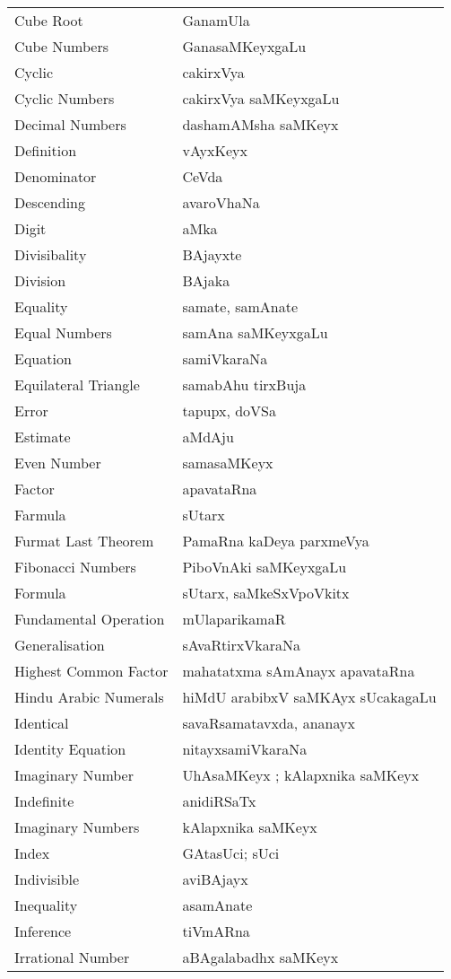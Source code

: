 \begin{longtable}{>{\rm}l@{\hspace{2cm}}l}
Cube Root & GanamUla\\
Cube Numbers & GanasaMKeyxgaLu\\
Cyclic & cakirxVya\\
Cyclic Numbers & cakirxVya saMKeyxgaLu\\
Decimal Numbers & dashamAMsha saMKeyx\\
Definition & vAyxKeyx\\
Denominator & CeVda\\
Descending & avaroVhaNa\\
Digit & aMka\\
Divisibality & BAjayxte\\
Division & BAjaka\\
Equality & samate, samAnate\\
Equal Numbers & samAna saMKeyxgaLu\\
Equation & samiVkaraNa\\
Equilateral Triangle & samabAhu tirxBuja\\
Error & tapupx, doVSa\\
Estimate & aMdAju\\
Even Number & samasaMKeyx\\
Factor & apavataRna\\
Farmula & sUtarx\\
Furmat Last Theorem & PamaRna kaDeya parxmeVya\\
Fibonacci Numbers & PiboVnAki saMKeyxgaLu\\
Formula & sUtarx, saMkeSxVpoVkitx\\
Fundamental Operation & mUlaparikamaR\\
Generalisation & sAvaRtirxVkaraNa\\
Highest Common Factor & mahatatxma sAmAnayx apavataRna\\
Hindu Arabic Numerals & hiMdU arabibxV saMKAyx sUcakagaLu\\
Identical & savaRsamatavxda, ananayx\\
Identity Equation & nitayxsamiVkaraNa\\
Imaginary Number & UhAsaMKeyx ; kAlapxnika saMKeyx\\
Indefinite & anidiRSaTx\\
Imaginary Numbers & kAlapxnika saMKeyx\\
Index & GAtasUci; sUci\\
Indivisible & aviBAjayx\\
Inequality & asamAnate\\
Inference & tiVmARna\\
Irrational Number & aBAgalabadhx saMKeyx\\

\end{longtable}
